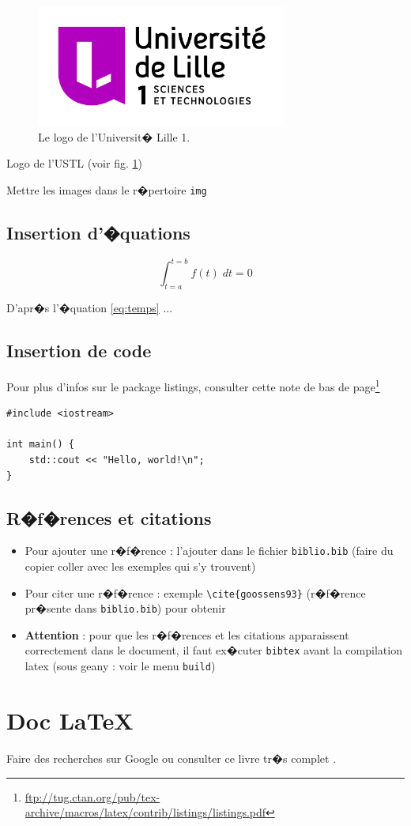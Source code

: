 \documentclass[11pt,oneside,noprintercorrection]{ustl}
\begin{document}
\begin{figure}[!ht]
  \centering
  \includegraphics[height=4cm]{logoLille1}
  \caption{Le logo de l'Universit� Lille 1.}
  \label{fig:ustl}
\end{figure}

Logo de l'USTL (voir fig. \ref{fig:ustl})

Mettre les images dans le r�pertoire \texttt{img}

\subsection{Insertion d'�quations}

\begin{equation}
\int_{t=a}^{t=b}f(t)\;dt = 0 \label{eq:temps}
\end{equation}

D'apr�s l'�quation \ref{eq:temps} ...

\subsection{Insertion de code}

Pour plus d'infos sur le package listings, consulter cette note de bas de page\footnote{
\url{ftp://tug.ctan.org/pub/tex-archive/macros/latex/contrib/listings/listings.pdf}

}

\begin{lstlisting}[frame=trBL]
#include <iostream>

int main() {
    std::cout << "Hello, world!\n";
}
\end{lstlisting}

\subsection{R�f�rences et citations}

\begin{itemize}
\item Pour ajouter une r�f�rence : l'ajouter dans le fichier \verb#biblio.bib# (faire du copier coller avec les exemples qui s'y trouvent)
\item Pour citer une r�f�rence : exemple \verb#\cite{goossens93}# (r�f�rence pr�sente dans \verb#biblio.bib#) pour obtenir \cite{goossens93}
\item {\bf Attention} : pour que les r�f�rences et les citations apparaissent correctement dans le document, il faut ex�cuter \verb#bibtex# avant la compilation latex (sous geany : voir le menu \verb#build#)
\end{itemize}

\section{Doc \LaTeX}
Faire des recherches sur Google ou consulter ce livre tr�s complet
\cite{goossens93}.




\small


\end{document}
